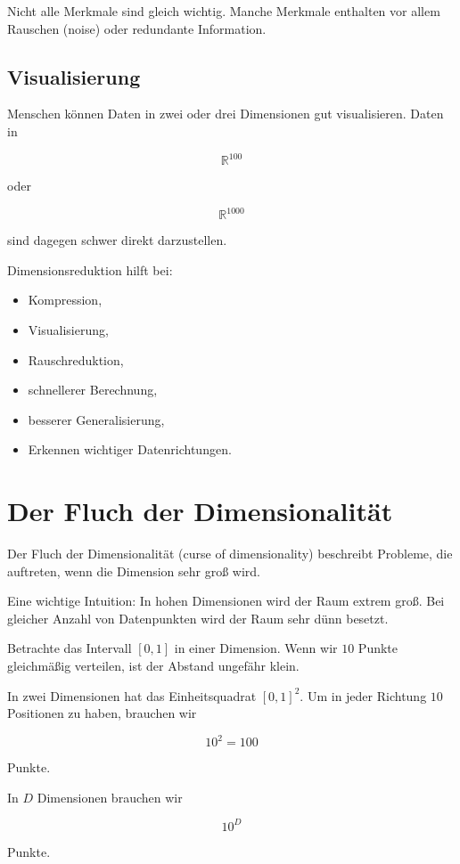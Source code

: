 Nicht alle Merkmale sind gleich wichtig.
Manche Merkmale enthalten vor allem Rauschen (noise) oder redundante Information.

\subsection{Visualisierung}

Menschen können Daten in zwei oder drei Dimensionen gut visualisieren.
Daten in

\[
    \mathbb{R}^{100}
\]

oder

\[
    \mathbb{R}^{1000}
\]

sind dagegen schwer direkt darzustellen.

\begin{conceptbox}
Dimensionsreduktion hilft bei:

\begin{itemize}
    \item Kompression,
    \item Visualisierung,
    \item Rauschreduktion,
    \item schnellerer Berechnung,
    \item besserer Generalisierung,
    \item Erkennen wichtiger Datenrichtungen.
\end{itemize}
\end{conceptbox}

\section{Der Fluch der Dimensionalität}

Der Fluch der Dimensionalität (curse of dimensionality) beschreibt Probleme, die auftreten, wenn die Dimension sehr groß wird.

Eine wichtige Intuition:
In hohen Dimensionen wird der Raum extrem groß.
Bei gleicher Anzahl von Datenpunkten wird der Raum sehr dünn besetzt.

\begin{examplebox}
Betrachte das Intervall \([0,1]\) in einer Dimension.
Wenn wir \(10\) Punkte gleichmäßig verteilen, ist der Abstand ungefähr klein.

In zwei Dimensionen hat das Einheitsquadrat \([0,1]^2\).
Um in jeder Richtung \(10\) Positionen zu haben, brauchen wir

\[
    10^2 = 100
\]

Punkte.

In \(D\) Dimensionen brauchen wir

\[
    10^D
\]

Punkte.
\end{examplebox}

